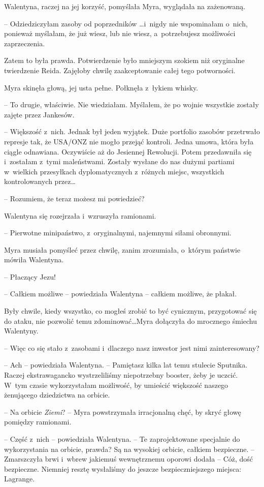 \documentclass[oneside,polish,11pt,sfheadings]{mwbk}
\begin{document}
Walentyna, raczej na jej korzyść, pomyślała Myra, wyglądała na
zażenowaną.

-- Odziedziczyłam zasoby od poprzedników \ldots i~nigdy nie wspominałam o~nich, ponieważ myślałam, że już wiesz, lub nie wiesz, a~potrzebujesz
możliwości zaprzeczenia.

Zatem to była prawda. Potwierdzenie było mniejszym szokiem niż
oryginalne twierdzenie Reida. Zajęłoby chwilę zaakceptowanie całej tego
potworności.

Myra skinęła głową, jej usta pełne. Połknęła z~łykiem whisky. 

-- To
drugie, właściwie. Nie wiedziałam. Myślałem, że po wojnie wszystkie
zostały zajęte przez Jankesów.

-- Większość z~nich. Jednak był jeden wyjątek. Duże portfolio zasobów
przetrwało represje tak, że USA/ONZ nie mogło przejąć kontroli. Jedna umowa,
która była ciągle odnawiana. Oczywiście aż do Jesiennej Rewolucji. Potem
przedawniła się i~zostałam z~tymi maleństwami. Zostały wysłane do nas
dużymi partiami w~wielkich przesyłkach dyplomatycznych z~różnych miejsc,
wszystkich kontrolowanych przez\ldots

-- Rozumiem, że teraz możesz mi powiedzieć?

Walentyna się rozejrzała i~wzruszyła ramionami.

-- Pierwotne minipaństwo, z~oryginalnymi, najemnymi siłami obronnymi.

Myra musiała pomyśleć przez chwilę, zanim zrozumiała, o~którym państwie
mówiła Walentyna.

-- Płaczący Jezu!

-- Całkiem możliwe -- powiedziała Walentyna -- całkiem możliwe, że płakał.

Były chwile, kiedy wszystko, co mogłeś zrobić to być cynicznym,
przygotować się do ataku, nie pozwolić temu zdominować\ldots Myra dołączyła
do mrocznego śmiechu Walentyny.

-- Więc co się stało z~zasobami i~dlaczego nasz inwestor jest nimi
zainteresowany?

-- Ach -- powiedziała Walentyna. -- Pamiętasz kilka lat temu stulecie
Sputnika. Raczej ekstrawagancko wystrzeliliśmy niepotrzebny booster,
żeby je uczcić. W~tym czasie wykorzystałam możliwość, by umieścić
większość naszego żenującego dziedzictwa na orbicie.

-- Na orbicie \textit{Ziemi}? -- Myra powstrzymała irracjonalną chęć, by
skryć głowę pomiędzy ramionami.

-- Część z~nich -- powiedziała Walentyna. -- Te zaprojektowane specjalnie
do wykorzystania na orbicie, prawda? Są na wysokiej orbicie, całkiem
bezpieczne. -- Zmarszczyła brwi i~wbrew jakiemuś wewnętrznemu oporowi
dodała -- Cóż, dość bezpieczne. Niemniej resztę wysłaliśmy do jeszcze
bezpieczniejszego miejsca: Lagrange.
\end{document}
